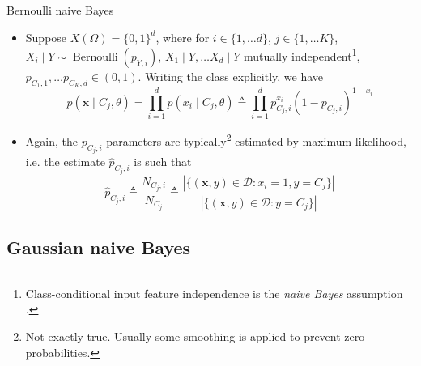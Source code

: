 \documentclass{beamer}
\numberwithin{equation}{section}
\begin{document}
\begin{frame}{Bernoulli naive Bayes}
    \begin{itemize}
        \item
        Suppose $ X(\Omega) = \{0, 1\}^d $, where for $ i \in
        \{1, \ldots d\} $, $ j \in \{1, \ldots K\} $,
        $ X_i \mid Y \sim \operatorname{Bernoulli}(p_{Y, i}) $,
         $ X_1 \mid Y, \ldots X_d \mid Y $ mutually independent\footnote{
            Class-conditional input feature independence is the
            \textit{naive Bayes} assumption \cite{bishop_ml}.
        }, $ p_{C_1, 1}, \ldots p_{C_K, d} \in (0, 1) $. Writing the class
        explicitly, we have
        \begin{equation} \label{bern_nb_like}
            p(\mathbf{x} \mid C_j, \theta) =
            \prod_{i = 1}^dp(x_i \mid C_j, \theta) \triangleq
            \prod_{i = 1}^dp_{C_j, i}^{x_i}(1 - p_{C_j, i})^{1 - x_i}
        \end{equation}

        \item
        Again, the $ p_{C_j, i} $ parameters are typically\footnote{
            Not exactly true. Usually some smoothing is applied to prevent
            zero probabilities.
        } estimated by
        maximum likelihood, i.e. the estimate $ \hat{p}_{C_j, i} $ is such that
        \begin{equation} \label{bern_nb_param_mle}
            \hat{p}_{C_j, i} \triangleq \frac{N_{C_j, i}}{N_{C_j}} \triangleq
            \frac{
                |\{(\mathbf{x}, y) \in \mathcal{D} : x_i = 1, y = C_j\}|
            }{
                |\{(\mathbf{x}, y) \in \mathcal{D} : y = C_j\}|
            } 
        \end{equation}
    \end{itemize}
\end{frame}

\subsection{Gaussian naive Bayes}
\end{document}
